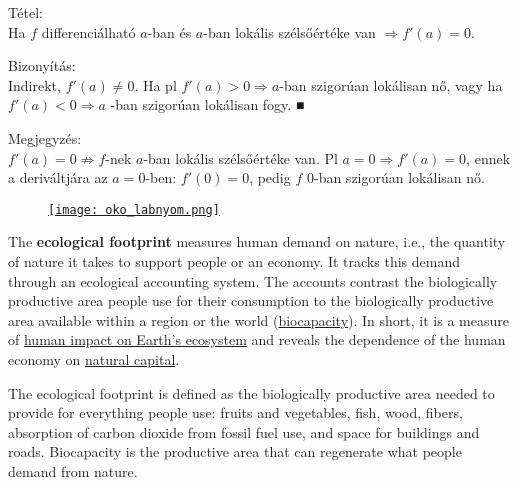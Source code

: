 \documentclass[12pt,a4paper]{scrartcl}
\newenvironment{tetel}{}{}
\newenvironment{bizonyitas}{}{}
\newenvironment{megjegyzes}{}{}
\newenvironment{ajanlofig}{\begin{figure}\begin{center}}{
\end{center}\end{figure}}
\begin{document}
\begin{tetel}

Tétel:\\
Ha \(f\) differenciálható \(a\)-ban és \(a\)-ban lokális szélsőértéke
van \(\left. \Rightarrow f'\left( a \right) = 0 \right.\).

\end{tetel}

\begin{bizonyitas}

Bizonyítás:\\
Indirekt, \(f'\left( a \right) \neq 0\). Ha pl
\(\left. f'\left( a \right) > 0\Rightarrow a \right.\)-ban szigorúan
lokálisan nő, vagy ha
\(\left. f'\left( a \right) < 0\Rightarrow a \right.\) -ban szigorúan
lokálisan fogy. ■

\end{bizonyitas}

\begin{megjegyzes}

Megjegyzés:\\
\(f'\left( a \right) = 0\nRightarrow f\)-nek \(a\)-ban lokális
szélsőértéke van. Pl
\(\left. a = 0\Rightarrow f'\left( a \right) = 0 \right.\), ennek a
deriváltjára az \(a = 0\)-ben: \(f'\left( 0 \right) = 0\), pedig \(f\)
0-ban szigorúan lokálisan nő.

\end{megjegyzes}

\begin{ajanlo}

\begin{ajanlofig}

\href{https://en.wikipedia.org/wiki/Ecological_footprint}{\texttt{[image: oko\_labnyom.png]}}

\end{ajanlofig}

The \textbf{ecological footprint} measures human demand on nature, i.e.,
the quantity of nature it takes to support people or an economy. It
tracks this demand through an ecological accounting system. The accounts
contrast the biologically productive area people use for their
consumption to the biologically productive area available within a
region or the world
(\href{https://en.wikipedia.org/wiki/Biocapacity}{biocapacity}). In
short, it is a measure of
\href{https://en.wikipedia.org/wiki/Human_impact_on_the_environment}{human
impact on Earth's ecosystem} and reveals the dependence of the human
economy on \href{https://en.wikipedia.org/wiki/Natural_capital}{natural
capital}.

The ecological footprint is defined as the biologically productive area
needed to provide for everything people use: fruits and vegetables,
fish, wood, fibers, absorption of carbon dioxide from fossil fuel use,
and space for buildings and roads. Biocapacity is the productive area
that can regenerate what people demand from nature.

\end{ajanlo}
\end{document}
